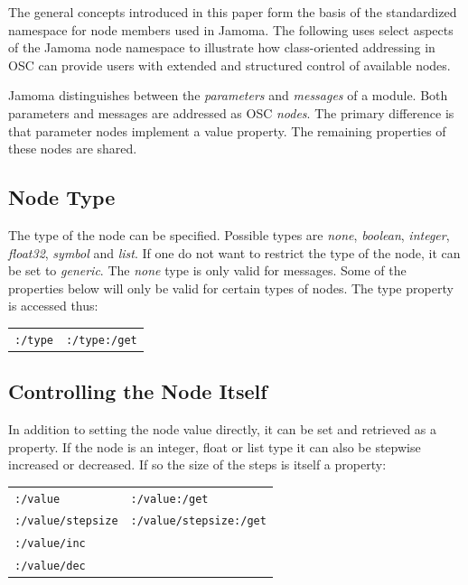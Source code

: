 \documentclass{NIME-alternate}
\begin{document}
The general concepts introduced in this paper form the basis of the standardized namespace for node members used in Jamoma. The following uses select aspects of the Jamoma node namespace to illustrate how class-oriented addressing in OSC can provide users with extended and structured control of available nodes.

Jamoma distinguishes between the \emph{parameters} and \emph{messages} of a module.  Both parameters and messages are addressed as OSC \emph{nodes}. The primary difference is that parameter nodes implement a value property.  The remaining properties of these nodes are shared.



\subsection{Node Type} %
\label{sub:type}

The type of the node can be specified. Possible types are \emph{none}, \emph{boolean}, \emph{integer}, \emph{float32}, \emph{symbol} and \emph{list}. If one do not want to restrict the type of the node, it can be set to \emph{generic}. The \emph{none} type is only valid for messages. Some of the properties below will only be valid for certain types of nodes. The type property is accessed thus:

\begin{tabular}{ll}
	\texttt{:/type} & \texttt{:/type:/get} \\
\end{tabular}




\subsection{Controlling the Node Itself} %
\label{sub:controlling_the_node_itself}

In addition to setting the node value directly, it can be set and retrieved as a property. If the node is an integer, float or list type it can also be stepwise increased or decreased. If so the size of the steps is itself a property:

\begin{tabular}{ll}
	\texttt{:/value} & \texttt{:/value:/get} \\
	\texttt{:/value/stepsize}  & \texttt{:/value/stepsize:/get} \\
	\texttt{:/value/inc} \\
	\texttt{:/value/dec} \\
\end{tabular}
\end{document}
